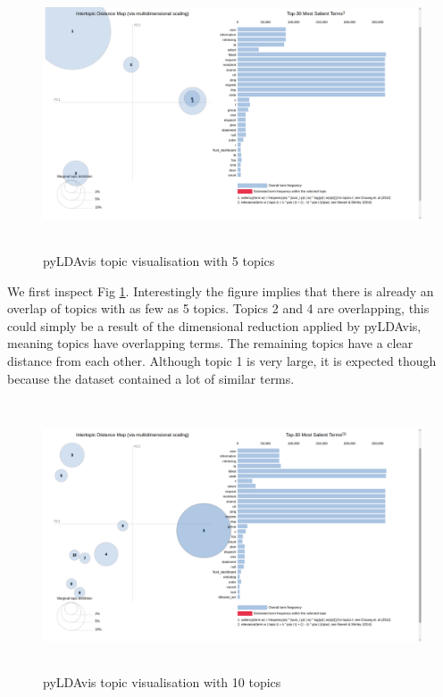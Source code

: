 \begin{figure}[h]
    \centering
    \includegraphics[width=15cm, height=8cm,trim=0 0 100px 0, clip=true]{figures/pyldavis/pyldavis_5.png}
    \caption{pyLDAvis topic visualisation with 5 topics}
    \label{fig:pyldavis_5}
\end{figure}
\FloatBarrier

We first inspect Fig \ref{fig:pyldavis_5}.
Interestingly the figure implies that there is already an overlap of topics with as few as 5 topics. Topics 2 and 4 are overlapping, this could simply be a result of the dimensional reduction applied by pyLDAvis, meaning topics have overlapping terms. The remaining topics have a clear distance from each other. Although topic 1 is very large, it is expected though because the dataset contained a lot of similar terms.

\begin{figure}[h]
    \centering
    \includegraphics[width=15cm, height=8cm,trim=0 0 100px 0, clip=true]{figures/pyldavis/pyldavis_10.png}
    \caption{pyLDAvis topic visualisation with 10 topics}
    \label{fig:pyldavis_10}
\end{figure}

